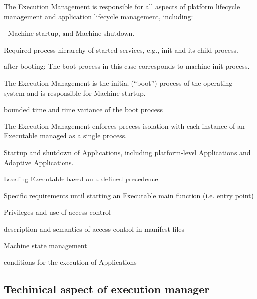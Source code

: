 The Execution Management is responsible for all aspects of platform lifecycle management and application lifecycle management, including\+:
\begin{DoxyItemize}
\item  Machine startup, and Machine shutdown.
\item Required process hierarchy of started services, e.\+g., init and its child process.
\begin{DoxyItemize}
\item after booting\+: The boot process in this case corresponds to machine init process.
\end{DoxyItemize}
\item The Execution Management is the initial (“boot”) process of the operating system and is responsible for Machine startup.
\begin{DoxyItemize}
\item bounded time and time variance of the boot process
\end{DoxyItemize}
\item The Execution Management enforces process isolation with each instance of an Executable managed as a single process.
\item Startup and shutdown of Applications, including platform-\/level Applications and Adaptive Applications.
\begin{DoxyItemize}
\item Loading Executable based on a defined precedence
\item Specific requirements until starting an Executable main function (i.\+e. entry point)
\end{DoxyItemize}
\item Privileges and use of access control
\begin{DoxyItemize}
\item description and semantics of access control in manifest files
\end{DoxyItemize}
\item Machine state management
\begin{DoxyItemize}
\item conditions for the execution of Applications
\end{DoxyItemize}
\end{DoxyItemize}

\subsection*{Techinical aspect of execution manager}


